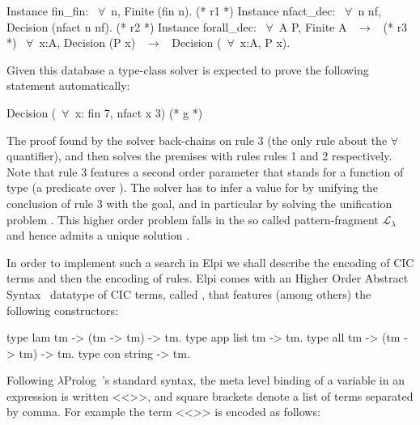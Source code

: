 \documentclass[sigconf,natbib=false,review]{acmart}
\newcommand{\llambda}{\ensuremath{\mathcal{L}_\lambda}\xspace}
\begin{document}
\begin{coqcode}
Instance fin_fin: ~$\forall$~n, Finite (fin n).             (* r1 *)
Instance nfact_dec: ~$\forall$~n nf, Decision (nfact n nf). (* r2 *)
Instance forall_dec: ~$\forall$~A P, Finite A ~$\to$~            (* r3 *)
  ~$\forall$~x:A, Decision (P x) ~$\to$~ Decision (~$\forall$~x:A, P x).
\end{coqcode}

\noindent Given this database a type-class solver is expected to
prove the following statement automatically:

\begin{coqcode}
  Decision (~$\forall$~x: fin 7, nfact x 3)                   (* g *)
\end{coqcode}

\noindent
The proof found by the solver back-chains on rule 3 (the only rule
about the $\forall$ quantifier), and then solves the premises with rules
rules 1 and 2 respectively.
Note that rule 3 features a second order parameter  that stands for
a function of type  (a predicate over ).
The solver has to infer a value for  by unifying the conclusion
of rule 3 with the goal, and in particular by solving the unification
problem . This higher order problem falls in the so
called pattern-fragment \llambda~\cite{miller92jsc} and hence admits a unique
solution .

In order to implement such a search in Elpi we shall describe the encoding
of CIC terms and then the encoding of rules. Elpi comes with
an Higher Order Abstract Syntax~\cite{10.1145/53990.54010} datatype of CIC
terms, called , that features (among others) the following
constructors:

\begin{elpicode}
type lam  tm -> (tm -> tm) -> tm.     %
type app  list tm -> tm.              %
type all  tm -> (tm -> tm) -> tm.     %
type con  string -> tm.               %
\end{elpicode}

\noindent
Following $\lambda$Prolog~\cite{miller_nadathur_2012}'s standard syntax,
the meta level binding of a variable  in an expression
 is written <<>>, and square brackets denote a
list of terms separated by comma. For example the term
<<>> is encoded as follows:
\end{document}

